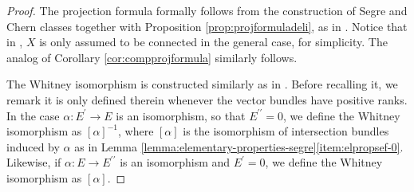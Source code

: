 \documentclass[JEP,XML,SOM,Unicode,published]{cedram}
\theoremstyle{plain}
\theoremstyle{definition}
\newcommand{\bis}{\prime\prime}
\begin{document}
\begin{proof}

The projection formula formally follows from the construction of Segre and Chern classes together with Proposition \ref{prop:projformuladeli}, as in
\cite[\textsection V.4.2]{Elkikfib}. Notice that in \loccit, $X$ is only assumed to be connected in the general case, for simplicity. The analog of Corollary \ref{cor:compprojformula} similarly follows.

The Whitney isomorphism is constructed similarly as in \cite[\textsection V.4.8]{Elkikfib}. Before recalling it, we remark it is only defined therein whenever the vector bundles have positive ranks. In the case $\alpha: E^{\prime} \to E$ is an isomorphism, so that $E^{\bis}=0$, we define the Whitney isomorphism as $[\alpha]^{-1}$, where $[\alpha]$ is the isomorphism of intersection bundles induced by $\alpha$ as in Lemma \ref{lemma:elementary-properties-segre}\eqref{item:elpropsef-0}. Likewise, if $\alpha: E\to E^{\bis}$ is an isomorphism and $E^{\prime}=0$, we define the Whitney isomorphism as $[\alpha]$.


\end{proof}
\end{document}
